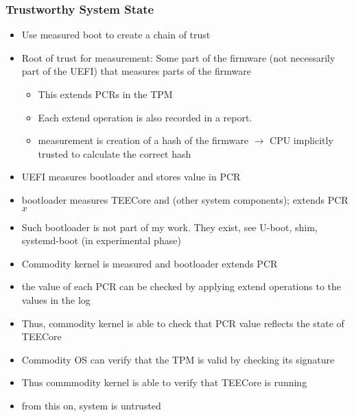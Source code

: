 \subsubsection{Trustworthy System State}
\begin{itemize}
    \item Use measured boot to create a chain of trust
    \item Root of trust for measurement: Some part of the firmware (not
          necessarily part of the UEFI) that measures parts of the firmware
          \begin{itemize}
              \item This extends PCRs in the TPM
              \item Each extend operation is also recorded in a report.
              \item measurement is creation of a hash of the firmware $\rightarrow$ CPU implicitly trusted to calculate the correct hash
          \end{itemize}
    \item UEFI measures bootloader and stores value in PCR
    \item bootloader measures TEECore and (other system components); extends PCR $x$
    \item Such bootloader is not part of my work. They exist, see U-boot, shim, systemd-boot (in experimental phase)
    \item Commodity kernel is measured and bootloader extends PCR
    \item the value of each PCR can be checked by applying extend operations to the values in the log
    \item Thus, commodity kernel is able to check that PCR value reflects the state of TEECore
    \item Commodity OS can verify that the TPM is valid by checking its signature
    \item Thus commmodity kernel is able to verify that TEECore is running
    \item from this on, system is untrusted
\end{itemize}

